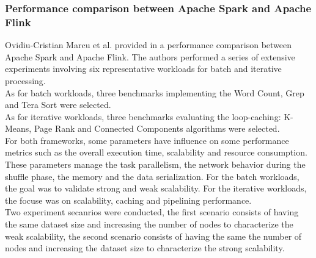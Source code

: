 \subsubsection{Performance comparison between Apache Spark and Apache Flink}
 	Ovidiu-Cristian Marcu et al. provided in \cite{a:comp} a performance comparison between Apache Spark and Apache Flink. The authors performed a series of extensive experiments involving six representative workloads for batch
and iterative processing. \\As for batch workloads, three benchmarks implementing the Word Count\cite{wc}, Grep\cite{wc} and Tera Sort\cite{wc} were selected.\\ As for iterative workloads, three benchmarks evaluating the loop-caching: K-Means, Page Rank\cite{wc} and Connected Components\cite{wc} algorithms were selected.\\ 
For both frameworks, some parameters have influence on some performance metrics such as the overall execution time, scalability and resource consumption. \\ These parameters manage the task parallelism, the
network behavior during the shuffle phase, the memory and the data serialization. 
 For the batch workloads, the goal was to validate strong and weak scalability. For the iterative workloads, the focuse was on scalability, caching and pipelining performance.\\
Two experiment secanrios were conducted, the first scenario consists of having the same dataset size and increasing the number of nodes to characterize the weak scalability, the second scenario consists of having the same the number of nodes and increasing the dataset size to characterize the strong scalability.
